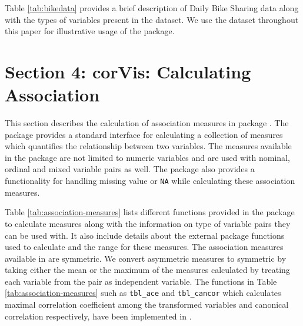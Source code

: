 Table \ref{tab:bikedata} provides a brief description of Daily Bike
Sharing data along with the types of variables present in the dataset.
We use the dataset throughout this paper for illustrative usage of the
package.

\hypertarget{section-4-corvis-calculating-association}{%
\section{Section 4: corVis: Calculating
Association}\label{section-4-corvis-calculating-association}}

This section describes the calculation of association measures in
package . The package provides a standard interface for
calculating a collection of measures which quantifies the relationship
between two variables. The measures available in the package are not
limited to numeric variables and are used with nominal, ordinal and
mixed variable pairs as well. The package also provides a functionality
for handling missing value or \texttt{NA} while calculating these
association measures.

Table \ref{tab:association-measures} lists different functions provided
in the package to calculate measures along with the information on type
of variable pairs they can be used with. It also include details about
the external package functions used to calculate and the range for these
measures. The association measures available in  are
symmetric. We convert asymmetric measures to symmetric by taking either
the mean or the maximum of the measures calculated by treating each
variable from the pair as independent variable. The functions in Table
\ref{tab:association-measures} such as \texttt{tbl\_ace} and
\texttt{tbl\_cancor} which calculates maximal correlation coefficient
among the transformed variables and canonical correlation respectively,
have been implemented in .

